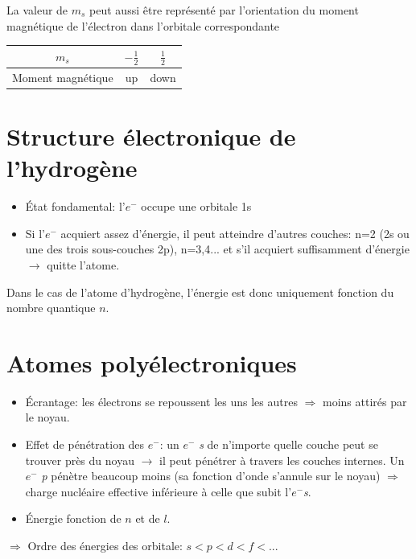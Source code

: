 \documentclass[11pt,a4paper,french]{article}
\begin{document}
La valeur de $m_s$ peut aussi être représenté par l'orientation du moment magnétique de l'électron dans l'orbitale correspondante

\begin{center}
	\begin{tabular}{c|cc}
		$m_s$ & $-\frac{1}{2}$ & $\frac{1}{2}$\\
		\hline
		Moment magnétique & up & down
	\end{tabular}
\end{center}


\section{Structure électronique de l'hydrogène}
\begin{itemize}
	\item \'Etat fondamental: l'$e^-$ occupe une orbitale 1s
	\item Si l'$e^-$ acquiert assez d'énergie, il peut atteindre d'autres couches: n=2 (2s ou une des trois sous-couches 2p), n=3,4... et s'il acquiert suffisamment d'énergie $\rightarrow$ quitte l'atome.
\end{itemize}

Dans le cas de l'atome d'hydrogène, l'énergie est donc uniquement fonction du nombre quantique $n$.

\section{Atomes polyélectroniques}
\begin{itemize}
	\item \'Ecrantage: les électrons se repoussent les uns les autres $\Rightarrow$ moins attirés par le noyau.
	\item Effet de pénétration des $e^-$: un $e^-$ \textit{s} de n'importe quelle couche peut se trouver près du noyau $\rightarrow$ il peut pénétrer à travers les couches internes.
		Un $e^-$ \textit{p} pénètre beaucoup moins (sa fonction d'onde s'annule sur le noyau) $\Rightarrow$ charge nucléaire effective inférieure à celle que subit l'$e^-$\textit{s}.
	\item \'Energie fonction de $n$ et de $l$.
\end{itemize}
$\Rightarrow$ Ordre des énergies des orbitale: $s<p<d<f<...$
\end{document}
